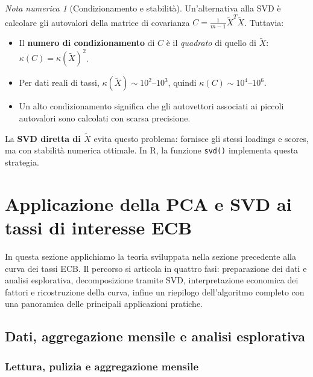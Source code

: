 \documentclass[11pt,a4paper]{article}
\theoremstyle{plain}
\theoremstyle{definition}
\theoremstyle{remark}
\newtheorem*{attenzione}{Nota numerica}
\begin{document}
\begin{attenzione}[Condizionamento e stabilità]
Un'alternativa alla SVD è calcolare gli autovalori della matrice di covarianza
$C = \frac{1}{m-1}\tilde{X}^T \tilde{X}$. Tuttavia:
\begin{itemize}
  \item Il \textbf{numero di condizionamento} di $C$ è il \emph{quadrato} di
        quello di $\tilde{X}$:
        $\kappa(C) = \kappa(\tilde{X})^2$.
  \item Per dati reali di tassi, $\kappa(\tilde{X}) \sim 10^2$--$10^3$, quindi
        $\kappa(C) \sim 10^4$--$10^6$.
  \item Un alto condizionamento significa che gli autovettori associati ai
        piccoli autovalori sono calcolati con scarsa precisione.
\end{itemize}
La \textbf{SVD diretta di $\tilde{X}$} evita questo problema: fornisce gli
stessi loadings e scores, ma con stabilità numerica ottimale. In R, la funzione
\texttt{svd()} implementa questa strategia.
\end{attenzione}

\section{Applicazione della PCA e SVD ai tassi di interesse ECB}

In questa sezione applichiamo la teoria sviluppata nella sezione precedente alla
curva dei tassi ECB. Il percorso si articola in quattro fasi: preparazione dei dati
e analisi esplorativa, decomposizione tramite SVD, interpretazione economica dei
fattori e ricostruzione della curva, infine un riepilogo dell'algoritmo completo
con una panoramica delle principali applicazioni pratiche.

\subsection{Dati, aggregazione mensile e analisi esplorativa}

\subsubsection{Lettura, pulizia e aggregazione mensile}
\label{sec:aggregazione}
\end{document}
